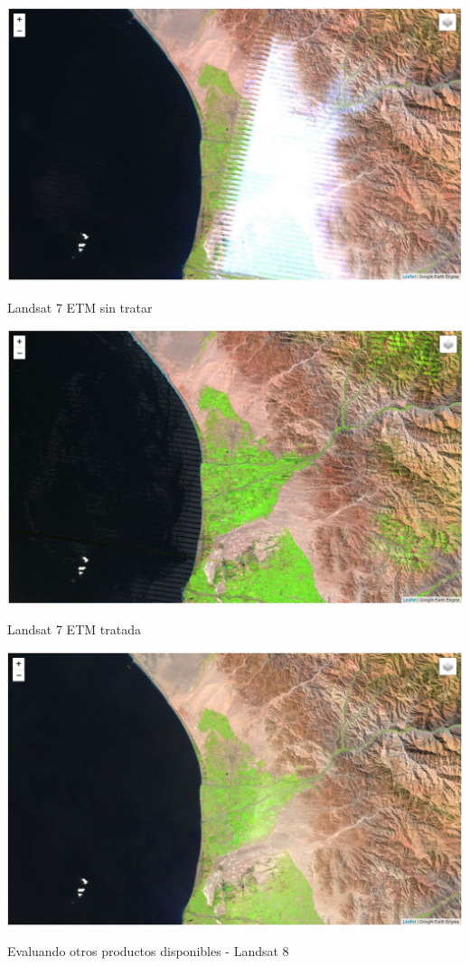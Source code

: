 {
	{
		\includegraphics[width=\paperwidth,height=\paperheight]{imgs/pre_process_1.JPG}
	}
	\begin{frame}{Landsat 7 ETM sin tratar}
	\end{frame}
}
{
	{
		\includegraphics[width=\paperwidth,height=\paperheight]{imgs/pre_process_2.JPG}
	}
	\begin{frame}{Landsat 7 ETM tratada}
	\end{frame}
}
{
	{
		\includegraphics[width=\paperwidth,height=\paperheight]{imgs/pre_process_3.JPG}
	}
	\begin{frame}{Evaluando otros productos disponibles - Landsat 8}
	\end{frame}
}
